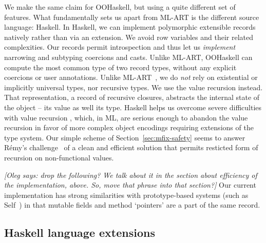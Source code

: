 \documentclass{jfp}
\newcommand{\oleg}[1]{{\it [Oleg says: #1]}}
\begin{document}
We make the same claim for OOHaskell, but using a quite different set
of features. What fundamentally sets us apart from {ML-ART} is the
different source language: Haskell. In Haskell, we can implement
polymorphic extensible records natively rather than via an
extension. We avoid row variables and their related
complexities. Our records permit introspection and thus let us
\emph{implement} narrowing and subtyping coercions and casts. Unlike
{ML-ART}, OOHaskell can compute the most common type of two record
types, without any explicit coercions or user annotations.  Unlike
ML-ART~\cite{ML-ART}, we do \emph{not} rely on existential or
implicitly universal types, nor recursive types. We use the value
recursion instead. That representation, a record of recursive
closures, abstracts the internal state of
the object -- its value as well its type.  Haskell helps us overcome
severe difficulties with value recursion \cite{ML-ART}, which, in ML,
are serious enough to abandon the value recursion in favor of more
complex object encodings requiring extensions of the type system. Our
simple scheme of Section~\ref{sec:mfix-safety} seems to answer
R{\'e}my's challenge~\cite{ML-ART} of a clean and efficient solution
that permits resticted form of recursion on non-functional values.

\oleg{drop the following? We talk about it in the section about
  efficiency of the implementation, above. So, move that phrase
  into that section?}
Our current implementation has strong similarities with
prototype-based systems (such as Self~\cite{Self}) in that mutable
fields and method `pointers' are a part of the same record. 

%
%






\subsection{Haskell language extensions}
\end{document}

